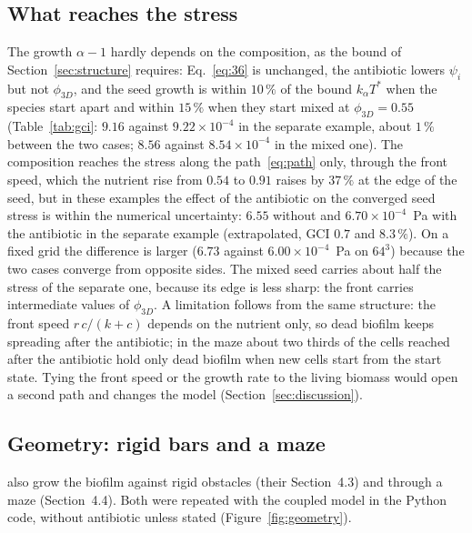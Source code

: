 \documentclass[11pt,a4paper]{article}
\newcommand{\phiD}{\phi_{3D}}
\begin{document}
\subsection{What reaches the stress}
\label{sec:stress}

The growth $\alpha-1$ hardly depends on the composition, as the bound of Section~\ref{sec:structure} requires: Eq.~\eqref{eq:36} is unchanged, the antibiotic lowers $\psi_i$ but not $\phiD$, and the seed growth is within $10\,\%$ of the bound $k_\alpha T^*$ when the species start apart and within $15\,\%$ when they start mixed at $\phiD=0.55$ (Table~\ref{tab:gci}: $9.16$ against $9.22\times10^{-4}$ in the separate example, about $1\,\%$ between the two cases; $8.56$ against $8.54\times10^{-4}$ in the mixed one). The composition reaches the stress along the path~\eqref{eq:path} only, through the front speed, which the nutrient rise from $0.54$ to $0.91$ raises by $37\,\%$ at the edge of the seed, but in these examples the effect of the antibiotic on the converged seed stress is within the numerical uncertainty: $6.55$ without and $6.70\times10^{-4}$~Pa with the antibiotic in the separate example (extrapolated, GCI $0.7$ and $8.3\,\%$). On a fixed grid the difference is larger ($6.73$ against $6.00\times10^{-4}$~Pa on $64^3$) because the two cases converge from opposite sides. The mixed seed carries about half the stress of the separate one, because its edge is less sharp: the front carries intermediate values of $\phiD$. A limitation follows from the same structure: the front speed $r\,c/(k+c)$ depends on the nutrient only, so dead biofilm keeps spreading after the antibiotic; in the maze about two thirds of the cells reached after the antibiotic hold only dead biofilm when new cells start from the start state. Tying the front speed or the growth rate to the living biomass would open a second path and changes the model (Section~\ref{sec:discussion}).

\subsection{Geometry: rigid bars and a maze}
\label{sec:geometry}

\citet{Klempt2024DiffusionDrivenGrowth} also grow the biofilm against rigid obstacles (their Section~4.3) and through a maze (Section~4.4). Both were repeated with the coupled model in the Python code, without antibiotic unless stated (Figure~\ref{fig:geometry}).
\end{document}
